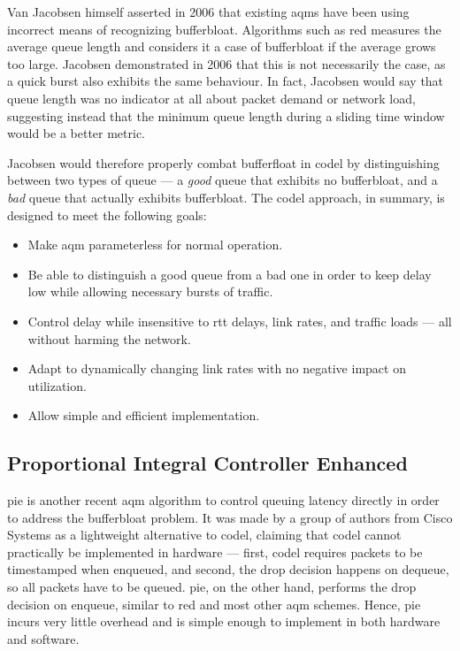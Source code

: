 Van Jacobsen himself asserted in 2006 that existing \gls{aqm}s have been using incorrect means of recognizing bufferbloat. \cite{a_rant_on_queues} Algorithms such as \gls{red} measures the average queue length and considers it a case of bufferbloat if the average grows too large. Jacobsen demonstrated in 2006 that this is not necessarily the case, as a quick burst also exhibits the same behaviour. In fact, Jacobsen would say that queue length was no indicator at all about packet demand or network load, \cite{a_rant_on_queues, controlling_queue_delay} suggesting instead that the minimum queue length during a sliding time window would be a better metric. \cite{controlling_queue_delay}

Jacobsen would therefore properly combat bufferfloat in \gls{codel} by distinguishing between two types of queue --- a \textit{good} queue that exhibits no bufferbloat, and a \textit{bad} queue that actually exhibits bufferbloat. The \gls{codel} approach, in summary, is designed to meet the following goals: \cite{rfc8289}

\begin{itemize}
    \item Make \gls{aqm} parameterless for normal operation.
    \item Be able to distinguish a good queue from a bad one in order to keep delay low while allowing necessary bursts of traffic.
    \item Control delay while insensitive to \gls{rtt} delays, link rates, and traffic loads --- all without harming the network.
    \item Adapt to dynamically changing link rates with no negative impact on utilization.
    \item Allow simple and efficient implementation.
\end{itemize}





\subsection{Proportional Integral Controller Enhanced}

\gls{pie} is another recent \gls{aqm} algorithm to control queuing latency directly in order to address the bufferbloat problem. It was made by a group of authors from Cisco Systems as a lightweight alternative to \gls{codel}, claiming that \gls{codel} cannot practically be implemented in hardware --- first, \gls{codel} requires packets to be timestamped when enqueued, and second, the drop decision happens on dequeue, so all packets have to be queued. \gls{pie}, on the other hand, performs the drop decision on enqueue, similar to \gls{red} and most other \gls{aqm} schemes. Hence, \gls{pie} incurs very little overhead and is simple enough to implement in both hardware and software.

